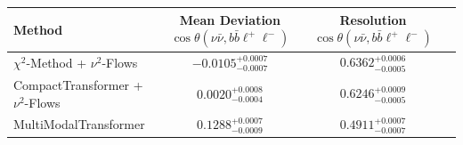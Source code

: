    \begin{tabular}{lccc}
        \toprule
        Method & Mean Deviation $\cos\theta(\nu\bar{\nu}, b\bar{b}\ell^+\ell^-)$ & Resolution $\cos\theta(\nu\bar{\nu}, b\bar{b}\ell^+\ell^-)$ \\
        \midrule
        $\chi^2$-Method + $\nu^2$-Flows & $-0.0105^{+0.0007}_{-0.0007}$ & $0.6362^{+0.0006}_{-0.0005}$ \\
        CompactTransformer + $\nu^2$-Flows & $0.0020^{+0.0008}_{-0.0004}$ & $0.6246^{+0.0009}_{-0.0005}$ \\
        MultiModalTransformer & $0.1288^{+0.0007}_{-0.0009}$ & $0.4911^{+0.0007}_{-0.0007}$ \\
        \bottomrule
    \end{tabular}